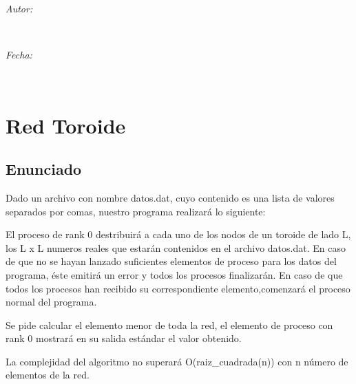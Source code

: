 \documentclass[11pt]{article}
\makeatletter
\let\theauthor\@author
\let\thedate\@date
\makeatother
\begin{document}
\begin{titlepage}
	\begin{minipage}{0.4\textwidth}
		\begin{flushleft} \large
			\emph{Autor:}\\
			\theauthor
			\end{flushleft}
			\end{minipage}~
			\begin{minipage}{0.4\textwidth}
			\begin{flushright} \large
			\emph{Fecha:} \\
			\thedate
		\end{flushright}
	\end{minipage}\\[1.5 cm]
 
	\vfill
	
\end{titlepage}


\tableofcontents
\pagebreak


\section{Red Toroide}
\subsection{Enunciado}
Dado un archivo con nombre datos.dat, cuyo contenido es una lista de valores
separados por comas, nuestro programa realizará lo siguiente:

El proceso de rank 0 destribuirá a cada uno de los nodos de un toroide de
lado L, los L x L numeros reales que estarán contenidos en el archivo datos.dat. En caso de que no se hayan lanzado suficientes elementos de proceso para los datos del programa, éste emitirá un error y todos los procesos finalizarán. En caso de que todos los procesos han recibido su correspondiente elemento,comenzará el proceso normal del programa.

Se pide calcular el elemento menor de toda la red, el elemento de
proceso con rank 0 mostrará en su salida estándar el valor obtenido.

La complejidad del algoritmo no superará O(raiz\_cuadrada(n)) con n número de elementos de la red.
\end{document}
